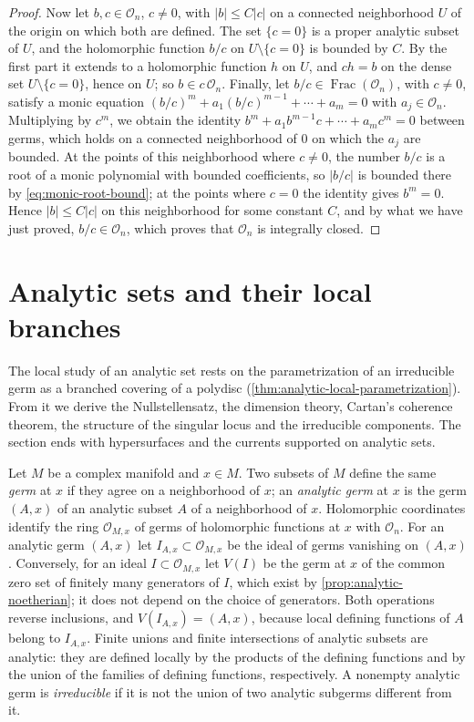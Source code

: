 \begin{proof}
Now let $b,c\in\mathcal O_n$, $c\neq0$, with $|b|\leq C|c|$ on a connected neighborhood $U$ of the origin on which both are defined. The set $\{c=0\}$ is a proper analytic subset of $U$, and the holomorphic function $b/c$ on $U\setminus\{c=0\}$ is bounded by $C$. By the first part it extends to a holomorphic function $h$ on $U$, and $ch=b$ on the dense set $U\setminus\{c=0\}$, hence on $U$; so $b\in c\,\mathcal O_n$. Finally, let $b/c\in\operatorname{Frac}(\mathcal O_n)$, with $c\neq0$, satisfy a monic equation $(b/c)^m+a_1(b/c)^{m-1}+\cdots+a_m=0$ with $a_j\in\mathcal O_n$. Multiplying by $c^m$, we obtain the identity $b^m+a_1b^{m-1}c+\cdots+a_mc^m=0$ between germs, which holds on a connected neighborhood of $0$ on which the $a_j$ are bounded. At the points of this neighborhood where $c\neq0$, the number $b/c$ is a root of a monic polynomial with bounded coefficients, so $|b/c|$ is bounded there by \eqref{eq:monic-root-bound}; at the points where $c=0$ the identity gives $b^m=0$. Hence $|b|\leq C|c|$ on this neighborhood for some constant $C$, and by what we have just proved, $b/c\in\mathcal O_n$, which proves that $\mathcal O_n$ is integrally closed.
\end{proof}

\section{Analytic sets and their local branches}
\label{sec:analytic-local-branches}

The local study of an analytic set rests on the parametrization of an irreducible germ as a branched covering of a polydisc (\cref{thm:analytic-local-parametrization}). From it we derive the Nullstellensatz, the dimension theory, Cartan's coherence theorem, the structure of the singular locus and the irreducible components. The section ends with hypersurfaces and the currents supported on analytic sets.

Let $M$ be a complex manifold and $x\in M$. Two subsets of $M$ define the same \emph{germ} at $x$ if they agree on a neighborhood of $x$; an \emph{analytic germ} at $x$ is the germ $(A,x)$ of an analytic subset $A$ of a neighborhood of $x$. Holomorphic coordinates identify the ring $\mathcal O_{M,x}$ of germs of holomorphic functions at $x$ with $\mathcal O_n$. For an analytic germ $(A,x)$ let $I_{A,x}\subset\mathcal O_{M,x}$ be the ideal of germs vanishing on $(A,x)$. Conversely, for an ideal $I\subset\mathcal O_{M,x}$ let $V(I)$ be the germ at $x$ of the common zero set of finitely many generators of $I$, which exist by \cref{prop:analytic-noetherian}; it does not depend on the choice of generators. Both operations reverse inclusions, and $V(I_{A,x})=(A,x)$, because local defining functions of $A$ belong to $I_{A,x}$. Finite unions and finite intersections of analytic subsets are analytic: they are defined locally by the products of the defining functions and by the union of the families of defining functions, respectively. A nonempty analytic germ is \emph{irreducible} if it is not the union of two analytic subgerms different from it.

